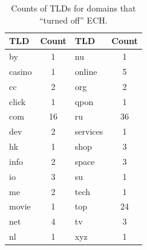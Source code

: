 \begin{table} 
	\centering
        \caption{Counts of TLDs for domains that ``turned off'' ECH.}
		\begin{tabular} { | l | c | l | c |}
		\hline
            \hline TLD & Count & TLD & Count  \\
		\hline
            \hline by & 1  & nu & 1 \\
            \hline casino & 1  & online & 5 \\
            \hline cc & 2  & org & 2 \\
            \hline click & 1  & qpon & 1 \\
            \hline com & 16  & ru & 36 \\
            \hline dev & 2  & services & 1 \\
            \hline hk & 1  & shop & 3 \\
            \hline info & 2  & space & 3 \\
            \hline io & 3  & su & 1 \\
            \hline me & 2  & tech & 1 \\
            \hline movie & 1  & top & 24 \\
            \hline net & 4  & tv & 3 \\
            \hline nl & 1  & xyz & 1 \\
		\hline
		\end{tabular}
	\label{tab:tldgone}
\end{table}
